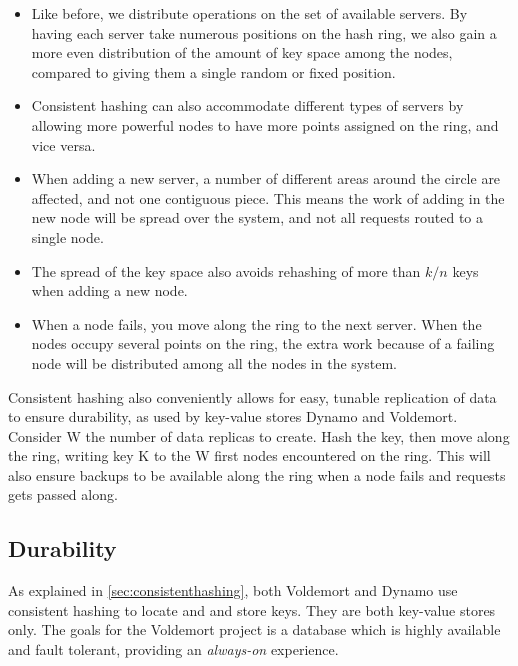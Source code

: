 \begin{itemize}
\item Like before, we distribute operations on the set of available servers. By having each server take numerous positions on the hash ring, we also gain a more even distribution of the amount of key space among the nodes, compared to giving them a single random or fixed position.

\item Consistent hashing can also accommodate different types of servers by allowing more powerful nodes to have more points assigned on the ring, and vice versa. 

\item When adding a new server, a number of different areas around the circle are affected, and not one contiguous piece. This means the work of adding in the new node will be spread over the system, and not all requests routed to a single node.

\item The spread of the key space also avoids rehashing of more than $k/n$ keys when adding a new node. 

\item When a node fails, you move along the ring to the next server. When the nodes occupy several points on the ring, the extra work because of a failing node will be distributed among all the nodes in the system.
\end{itemize}

Consistent hashing also conveniently allows for easy, tunable replication of data to ensure durability, as used by key-value stores Dynamo\cite{dynamo} and Voldemort\cite{voldemort}. Consider W the number of data replicas to create. Hash the key, then move along the ring, writing key K to the W first nodes encountered on the ring. This will also ensure backups to be available along the ring when a node fails and requests gets passed along.

\subsection{Durability}
As explained in \ref{sec:consistenthashing}, both Voldemort and Dynamo use consistent hashing to locate and and store keys.
They are both key-value stores only.
The goals for the Voldemort project is a database which is highly available and fault tolerant, providing an \emph{always-on} experience.

